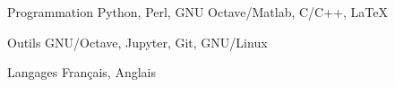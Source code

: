 

\begin{cvskills}

  \cvskill
    {Programmation} %
    {Python, Perl, GNU Octave/Matlab, C/C++, LaTeX} %

  \cvskill
    {Outils} %
		{GNU/Octave, Jupyter, Git, GNU/Linux} %

  \cvskill
    {Langages} %
    {Français, Anglais} %

\end{cvskills}
